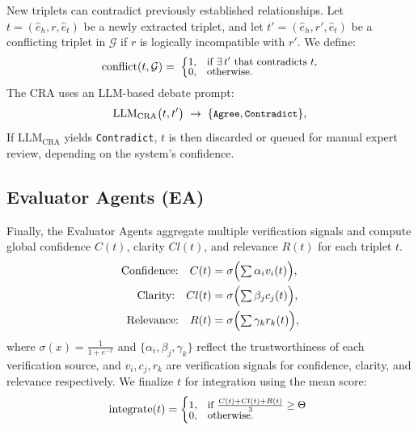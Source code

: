 \documentclass{article}
\begin{document}
New triplets can contradict previously established relationships. Let $t = (\hat{e}_h, r, \hat{e}_t)$ be a newly extracted triplet, and let $t'=(\hat{e}_h, r', \hat{e}_t)$ be a conflicting triplet in $\mathcal{G}$ if $r$ is logically incompatible with $r'$. We define:
\begin{equation}
\fontsize{9pt}{7pt}\selectfont
\mathrm{conflict}(t,\mathcal{G}) 
=\;
\begin{cases}
1, & \text{if } \exists\, t' \text{ that contradicts } t, \\
0, & \text{otherwise}.
\end{cases}
\end{equation}
The CRA uses an LLM-based debate prompt:
\begin{equation}
\fontsize{9pt}{7pt}\selectfont
\mathrm{LLM}_{\mathrm{CRA}} \bigl( t, t' \bigr) \;\to\; 
\{\texttt{Agree}, \texttt{Contradict}\},
\end{equation}
If $\mathrm{LLM}_{\mathrm{CRA}}$ yields \texttt{Contradict}, $t$ is then discarded or queued for manual expert review, depending on the system’s confidence.

\subsection{Evaluator Agents (EA)}

Finally, the Evaluator Agents aggregate multiple verification signals and compute global confidence $C(t)$, clarity $Cl(t)$, and relevance $R(t)$ for each triplet $t$.
{\fontsize{9pt}{7pt}\selectfont
\begin{align}
    \text{Confidence:}\quad C(t) &= \sigma\Bigl(\textstyle\sum \alpha_i v_i(t)\Bigr), \\
    \text{Clarity:}\quad Cl(t) &= \sigma\Bigl(\textstyle\sum \beta_j c_j(t)\Bigr), \\
    \text{Relevance:}\quad R(t) &= \sigma\Bigl(\textstyle\sum \gamma_k r_k(t)\Bigr),
\end{align}}
where \( \sigma(x) = \frac{1}{1+e^{-x}} \) and \(\{\alpha_i, \beta_j, \gamma_k\}\) reflect the trustworthiness of each verification source, and \( v_i, c_j, r_k \) are verification signals for confidence, clarity, and relevance respectively. We finalize $t$ for integration using the mean score:
\begin{equation}
\fontsize{9pt}{7pt}\selectfont
    \mathrm{integrate}(t) = 
    \begin{cases}
        1, & \text{if } \frac{C(t) + Cl(t) + R(t)}{3} \geq \Theta \ \\
        0, & \text{otherwise}.
    \end{cases}
\end{equation}
\end{document}
